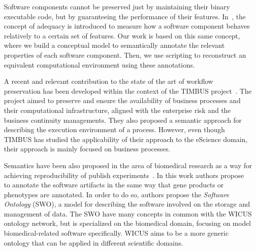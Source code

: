 Software components cannot be preserved just by maintaining their binary executable code, but by guaranteeing the performance of their features. In~\cite{Matthews}, the concept of adequacy is introduced to measure how a software component behaves relatively to a certain set of features. Our work is based on this same concept, where we build a conceptual model to semantically annotate the relevant properties of each software component. Then, we use scripting to reconstruct an equivalent computational environment using these annotations.

A recent and relevant contribution to the state of the art of workflow preservation has been developed within the context of the TIMBUS project~\cite{Mayer2014Ontologies}. The project  aimed to preserve and ensure the availability of business processes and their computational infrastructure, aligned with the enterprise risk and the business continuity managements. They also proposed a semantic approach for describing the execution environment of a process.  However, even though TIMBUS has studied the applicability of their approach to the eScience domain, their approach is mainly focused on business processes.

Semantics have been also proposed in the area of biomedical research as a way for achieving reproducibility of publish experiments~\cite{MaloneSWO2014}. In this work authors propose to annotate the software artifacts in the same way that gene products or phenotypes are annotated. In order to do so, authors propose the {\it Software Ontology} (SWO), a model for describing the software involved on the storage and management of data. The SWO have many concepts in common with the WICUS ontology  network, but is specialized on the biomedical domain, focusing on model biomedical-related software specifically. WICUS aims to be a more generic ontology that can be applied in different scientific domains.

